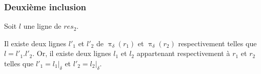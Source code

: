 \documentclass[french]{article}
\DeclareMathOperator{\proj}{\pi}
\newcommand{\projDelta}{\proj_{\delta}}
\begin{document}
\subsubsection*{Deuxième inclusion}
Soit $l$ une ligne de $res_2$.

Il existe deux lignes $l'_1$ et $l'_2$ de $\projDelta(r_1)$
et $\projDelta(r_2)$ respectivement telles que
$l = l'_1 . l'_2$.
Or, il existe deux lignes $l_1$ et $l_2$ appartenant respectivement
à $r_1$ et $r_2$ telles que 
$l'_1 = l_1 |_\delta$
et 
$l'_2 = l_2 |_\delta$.
\end{document}
